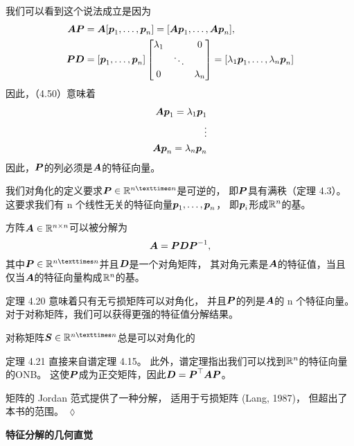 我们可以看到这个说法成立是因为
\begin{align}
    \A\P &= \A[\bs{p}_1,\dots,\bs{p}_n] = [\A\bs{p}_1,\dots,\A\bs{p}_n], \\
    \P\bs{D} &= [\bs{p}_1,\dots,\bs{p}_n]
    \begin{bmatrix}
        \lambda_1 & & 0 \\
        & \ddots & \\
        0 & & \lambda_n
    \end{bmatrix}=
    [\lambda_1\bs{p}_1,\dots,\lambda_n\bs{p}_n]
\end{align}
因此，（4.50）意味着
\begin{align}
   \A\p_1 = \lambda_1\p_1 \\
   \vdots \notag\\
   \A\p_n = \lambda_n\p_n
\end{align}
因此，$\P$的列必须是$\A$的特征向量。

我们对角化的定义要求$\P \in \R^{n×n}$是可逆的，
即$\P$具有满秩（定理 4.3）。
这要求我们有 n 个线性无关的特征向量$\p_1,\dots,\p_n$，
即$\p_i$形成$\R^n$的基。

\begin{theorem}[特征分解]
方阵$\A \in \R^{n\times n}$可以被分解为
\begin{equation}
    \A =  \P\bs{D}\P^{-1},
\end{equation}
其中$\P \in \R^{n×n}$并且$\D$是一个对角矩阵，
其对角元素是$\A$的特征值，当且仅当$\A$的特征向量构成$\R^n$的基。
\end{theorem}

定理 4.20 意味着只有无亏损矩阵可以对角化，
并且$\P$的列是$\A$的 n 个特征向量。
对于对称矩阵，我们可以获得更强的特征值分解结果。

\begin{theorem}
    对称矩阵$\S \in \R^{n×n}$总是可以对角化的
\end{theorem}

定理 4.21 直接来自谱定理 4.15。
此外，谱定理指出我们可以找到$\R^n$的特征向量的ONB。
这使$\P$成为正交矩阵，因此$\D = \P^\top\A\P$。

\begin{remark}
    矩阵的 Jordan 范式提供了一种分解，
    适用于亏损矩阵 (Lang, 1987)，
    但超出了本书的范围。
    \hfill $\lozenge$
\end{remark}

\begin{center}
    \textbf{特征分解的几何直觉}
\end{center}


